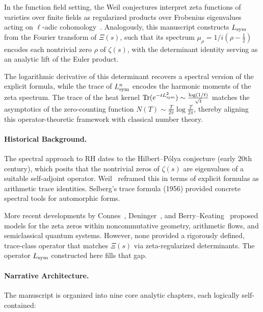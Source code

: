 In the function field setting, the Weil conjectures interpret zeta functions of varieties over finite fields as regularized products over Frobenius eigenvalues acting on \(\ell\)-adic cohomology~\cite{Deligne1971WeilI}. Analogously, this manuscript constructs \( L_{\mathrm{sym}} \) from the Fourier transform of \( \Xi(s) \), such that its spectrum \( \mu_\rho = 1 / i(\rho - \tfrac{1}{2}) \) encodes each nontrivial zero \( \rho \) of \( \zeta(s) \), with the determinant identity serving as an analytic lift of the Euler product.

The logarithmic derivative of this determinant recovers a spectral version of the explicit formula, while the trace of \( L_{\mathrm{sym}}^n \) encodes the harmonic moments of the zeta spectrum. The trace of the heat kernel \( \mathrm{Tr}(e^{-tL_{\mathrm{sym}}^2}) \sim \tfrac{\log(1/t)}{\sqrt{t}} \) matches the asymptotics of the zero-counting function \( N(T) \sim \tfrac{T}{2\pi} \log \tfrac{T}{2\pi} \), thereby aligning this operator-theoretic framework with classical number theory.

\paragraph*{Historical Background.} The spectral approach to RH dates to the Hilbert--Pólya conjecture (early 20th century), which posits that the nontrivial zeros of \( \zeta(s) \) are eigenvalues of a suitable self-adjoint operator. Weil~\cite{Weil1952Explicite} reframed this in terms of explicit formulas as arithmetic trace identities. Selberg's trace formula (1956) provided concrete spectral tools for automorphic forms.

More recent developments by Connes~\cite{Connes1999TraceFormula}, Deninger~\cite{Deninger1998Frobenius}, and Berry--Keating~\cite{Berry1986RiemannSpectra} proposed models for the zeta zeros within noncommutative geometry, arithmetic flows, and semiclassical quantum systems. However, none provided a rigorously defined, trace-class operator that matches \( \Xi(s) \) via zeta-regularized determinants. The operator \( L_{\mathrm{sym}} \) constructed here fills that gap.

\paragraph*{Narrative Architecture.} The manuscript is organized into nine core analytic chapters, each logically self-contained:

